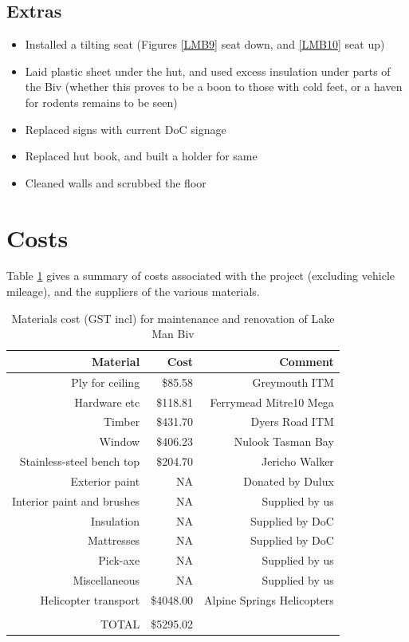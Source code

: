 \documentclass[12pt]{article} %
\begin{document}
\subsection{Extras}

\begin{itemize}
 \item Installed a tilting seat (Figures \ref{LMB9} seat down, and \ref{LMB10} seat up)
 \item Laid plastic sheet under the hut, and used excess insulation under parts of the Biv (whether this proves to be a boon to those with cold feet, or a haven for rodents remains to be seen)
 \item Replaced signs with current DoC signage
 \item Replaced hut book, and built a holder for same
 \item Cleaned walls and scrubbed the floor
\end{itemize}

\section{Costs}

Table \ref{costs} gives a summary of costs associated with the project (excluding vehicle mileage), and the suppliers of the various materials.

\begin{table}[ht]
\caption{Materials cost (GST incl) for maintenance and renovation of Lake Man Biv} %
\label{costs}
\centering %
\begin{tabular}{rrr}
\hline
Material & Cost & Comment \\ [0.5ex]
\hline %
Ply for ceiling & \$85.58 & Greymouth ITM\\
Hardware etc & \$118.81 & Ferrymead Mitre10 Mega\\
Timber & \$431.70 & Dyers Road ITM\\
Window & \$406.23 & Nulook Tasman Bay\\
Stainless-steel bench top & \$204.70 & Jericho Walker\\
Exterior paint & NA & Donated by Dulux\\
Interior paint and brushes & NA & Supplied by us\\
Insulation & NA & Supplied by DoC\\
Mattresses & NA & Supplied by DoC\\
Pick-axe & NA & Supplied by us\\
Miscellaneous & NA & Supplied by us\\
Helicopter transport & \$4048.00 & Alpine Springs Helicopters\\ [1ex] %
\hline \\
TOTAL & \$5295.02\\
\hline \hline %
\end{tabular}
\label{costs} %
\end{table}
\end{document}
